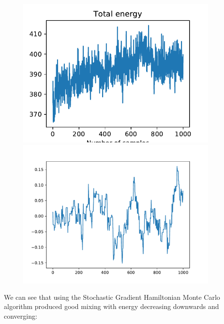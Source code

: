 \begin{figure}[H]
	\centering
	\begin{minipage}{0.45\textwidth}
		\centering
		\includegraphics[width=0.9\textwidth]{hmc-energy-sim.pdf} %
	\end{minipage}\hfill
	\begin{minipage}{0.45\textwidth}
		\centering
		\includegraphics[width=0.9\textwidth]{hmc-trace-sim.pdf} %
	\end{minipage}
\end{figure}

We can see that using the Stochastic Gradient Hamiltonian Monte Carlo algorithm produced good mixing with energy decreasing downwards and converging:

